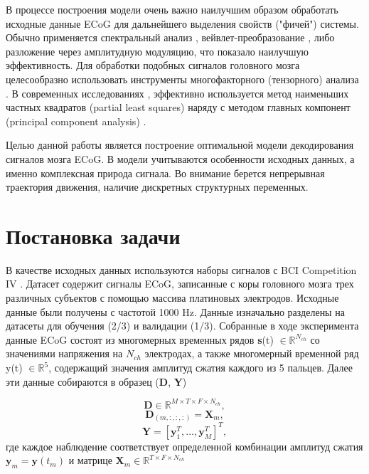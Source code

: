 \documentclass[12pt,twoside]{article}
\begin{document}
		В процессе построения модели очень важно наилучшим образом обработать исходные данные ECoG для дальнейшего выделения свойств ("фичей") системы. Обычно применяется спектральный анализ \cite{Krusienski2006}, вейвлет-преобразование \cite{MOTRENKO2018}, либо разложение через амплитудную модуляцию, что показало наилучшую эффективность. Для обработки подобных сигналов головного мозга целесообразно использовать инструменты многофакторного (тензорного) анализа \cite{Eliseyev2011}. В современных исследованиях \cite{Eliseyev2011a}, эффективно используется метод наименьших частных квадратов (partial least squares) \cite{Ng.} наряду с методом главных компонент (principal component analysis) \cite{Brems}.  
		
		Целью данной работы является построение оптимальной модели декодирования сигналов мозга ECoG. В модели учитываются особенности исходных данных, а именно комплексная природа сигнала. Во внимание берется непрерывная траектория движения, наличие дискретных структурных переменных.     
		

\section{Постановка задачи}
В качестве исходных данных используются наборы сигналов с BCI Competition IV \cite{Miller2008}. Датасет содержит сигналы ECoG, записанные с коры головного мозга трех различных субъектов с помощью массива платиновых электродов. Исходные данные были получены с частотой 1000 Hz. Данные изначально разделены на датасеты для обучения (2/3) и валидации (1/3). 
Собранные в ходе эксперимента данные ECoG состоят из многомерных временных рядов \textbf{s}(t) $\in \mathbb{R}^{N_{ch}}$ со значениями напряжения на $N_{ch}$ электродах, а также многомерный временной ряд y(t) $\in \mathbb{R}^5$, содержащий значения амплитуд сжатия каждого из 5 пальцев. Далее эти данные собираются в образец (\textbf{D}, \textbf{Y})

\begin{equation}
\textbf{D} \in \mathbb{R}^{M \times T \times F \times N_{ch}},
\end{equation}       
\begin{equation}
\textbf{D}_{(m, :,:,:)} = \textbf{X}_m,
\end{equation}       
\begin{equation}  
\textbf{Y} = [\textbf{y}^T_1, ..., \textbf{y}^T_M ]^T,
\end{equation}
где каждое наблюдение соответствует определенной комбинации амплитуд сжатия $ \textbf{y}_m = \textbf{y}(t_m) $ и матрице $ \textbf{X}_m  \in \mathbb{R}^{T \times F \times N_{ch}}$  
\end{document}
